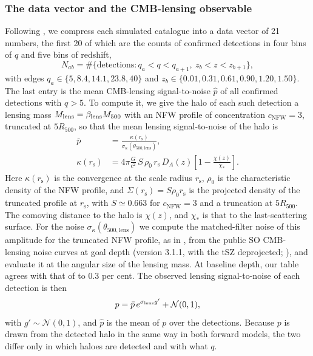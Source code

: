 \subsubsection{The data vector and the CMB-lensing observable}

Following \citet{Zubeldia2025}, we compress each simulated catalogue into a data vector of 21 numbers, the
first 20 of which are the counts of confirmed detections in four bins of $q$ and five bins of redshift,
\begin{equation}
N_{ab} = \#\{\text{detections}: q_a<q<q_{a+1},\ z_b<z<z_{b+1}\},
\label{eq:counts}
\end{equation}
with edges $q_a\in\{5, 8.4, 14.1, 23.8, 40\}$ and $z_b\in\{0.01, 0.31, 0.61, 0.90, 1.20, 1.50\}$. The last
entry is the mean CMB-lensing signal-to-noise $\hat p$ of all confirmed detections with $q>5$. To compute
it, we give the halo of each such detection a lensing mass $M_\mathrm{lens}=\beta_\mathrm{lens} M_{500}$ with an NFW
profile \citep{NFW1997} of concentration $c_\mathrm{NFW}=3$, truncated at $5R_{500}$, so that the mean
lensing signal-to-noise of the halo is
\begin{equation}
\begin{split}
\bar p &= \frac{\kappa(r_\mathrm{s})}{\sigma_\kappa(\theta_{500,\mathrm{lens}})},\\
\kappa(r_\mathrm{s}) &= 4\pi\frac{G}{c^2}\,S\,\rho_0\,r_\mathrm{s}\,D_A(z)\left[1-\frac{\chi(z)}{\chi_*}\right].
\end{split}
\label{eq:pbar}
\end{equation}
Here $\kappa(r_\mathrm{s})$ is the convergence at the scale radius $r_\mathrm{s}$, $\rho_0$ is the
characteristic density of the NFW profile, and $\Sigma(r_\mathrm{s})=S\rho_0r_\mathrm{s}$ is the projected
density of the truncated profile at $r_\mathrm{s}$, with $S\simeq0.663$ for $c_\mathrm{NFW}=3$ and a
truncation at $5R_{500}$. The comoving distance to the halo is $\chi(z)$, and $\chi_*$ is that to the
last-scattering surface. For the noise $\sigma_\kappa(\theta_{500,\mathrm{lens}})$ we compute the
matched-filter noise of this amplitude for the truncated NFW profile, as in \citet{ZubeldiaChallinor2019},
from the public SO CMB-lensing noise curves at goal depth (version 3.1.1, with the tSZ deprojected;
\citealt{SO2019}), and evaluate it at the angular size of the lensing mass. At baseline depth, our table
agrees with that of \citet{Zubeldia2025} to 0.3 per cent. The observed lensing signal-to-noise of each detection is then
\begin{equation}
p = \bar p\,e^{\sigma_\mathrm{lens} g'} + \mathcal N(0,1),
\label{eq:p}
\end{equation}
with $g'\sim\mathcal N(0,1)$, and $\hat p$ is the mean of $p$ over the detections. Because $p$ is drawn from
the detected halo in the same way in both forward models, the two differ only in which haloes are detected
and with what $q$.

